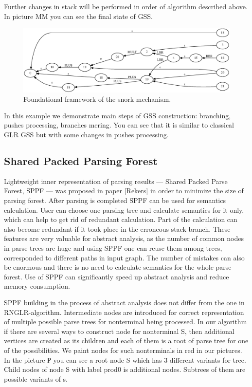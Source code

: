 \documentclass{sigplanconf}
\begin{document}
Further changes in stack will be performed in order of algorithm described above. In picture MM you can see the final state of GSS.

\begin{figure}
    \begin{center}
        \includegraphics[scale=0.5]{Graphs/stack_5_13.eps}
    \end{center}
    \caption{Foundational framework of the snork mechanism.}
    \label{fig-ffsm}
\end{figure}

	In this example we demonstrate main steps of GSS construction: branching, pushes processing, branches mering. You can see that it is similar to classical GLR GSS but with some changes in pushes processing. 


\subsection{Shared Packed Parsing Forest}
	Lightweight inner representation of parsing results — Shared Packed Parse Forest, SPPF — was proposed in paper [Rekers] in order to minimize the size of parsing forest. After parsing is completed SPPF can be used for semantics calculation. User can choose one parsing tree and calculate semantics for it only, which can help to get rid of redundant calculation. Part of the calculation can also become redundant if it took place in the erroneous stack branch. These features are very valuable for abstract analysis, as the number of common nodes in parse trees are huge and using SPPF one can reuse them among trees, corresponded to different paths in input graph. The number of mistakes can also be enormous and there is no need to calculate semantics for the whole parse forest. Use of SPPF can significantly speed up abstract analysis and reduce memory consumption. 

SPPF building in the process of abstract analysis does not differ from the one in RNGLR-algorithm. Intermediate nodes are introduced for correct representation of multiple possible parse trees for nonterminal being processed. In our algorithm if there are several ways to construct node for nonterminal S, then additional vertices are created as its children and each of them is a root of parse tree for one of the possibilities. We paint nodes for such nonterminals in red in our pictures.  In the picture Р you can see a root node S which has 3 different variants for tree. Child nodes of node S with label prod0 is additional nodes. Subtrees of them are possible variants of s. 
\end{document}
